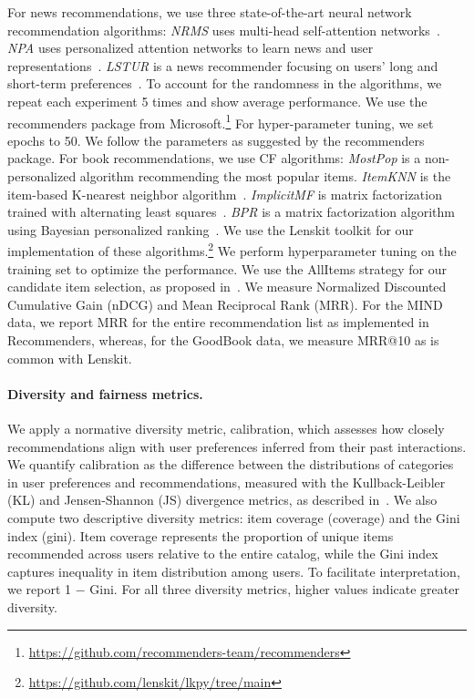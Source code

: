 \documentclass[runningheads]{llncs}
\begin{document}
For news recommendations, we use three state-of-the-art neural network recommendation algorithms:
\textit{NRMS} uses multi-head self-attention networks~\cite{wu2019NRMS}. 
\textit{NPA} uses personalized attention networks to learn news and user representations~\cite{Chuhan2019NPA}. 
\textit{LSTUR} is a news recommender focusing on users' long and short-term preferences~\cite{Fangzhao2019LSTUR}. 
To account for the randomness in the algorithms, we repeat each experiment 5 times and show average performance.
We use the recommenders package from Microsoft.\footnote{\url{https://github.com/recommenders-team/recommenders}}
For hyper-parameter tuning, we set epochs to 50. 
We follow the parameters as suggested by the recommenders package.
For book recommendations, we use CF algorithms:
    \textit{MostPop} is a non-personalized algorithm recommending the most popular items. 
    \textit{ItemKNN} is the item-based K-nearest neighbor algorithm~\cite{Deshpande2004Item}. 
    \textit{ImplicitMF} is matrix factorization trained with alternating least squares~\cite{Yifan2008ImplicitMF}. 
    \textit{BPR} is a matrix factorization algorithm using Bayesian personalized ranking~\cite{Rendle2009BPR}. 
We use the Lenskit toolkit for our implementation of these algorithms.\footnote{\url{https://github.com/lenskit/lkpy/tree/main}}
We perform hyperparameter tuning on the training set to optimize the performance. 
We use the AllItems strategy for our candidate item selection, as proposed in~\cite{Bellogin2011Precision}. 
We measure Normalized Discounted Cumulative Gain (nDCG) and Mean Reciprocal Rank (MRR).
For the MIND data, we report MRR for the entire recommendation list as implemented in Recommenders, whereas, for the GoodBook data, we measure MRR@10 as is common with Lenskit.


\paragraph{Diversity and fairness metrics.} 
We apply a normative diversity metric, calibration, which assesses how closely recommendations align with user preferences inferred from their past interactions. 
We quantify calibration as the difference between the distributions of categories in user preferences and recommendations, measured with the Kullback-Leibler (KL) and Jensen-Shannon (JS) divergence metrics, as described in~\cite{Vrijenhoek2022RADio}.  
We also compute two descriptive diversity metrics: item coverage (coverage) and the Gini index (gini). 
Item coverage represents the proportion of unique items recommended across users relative to the entire catalog, while the Gini index captures inequality in item distribution among users. 
To facilitate interpretation, we report 1 $-$ Gini.
For all three diversity metrics, higher values indicate greater diversity. 
\end{document}
